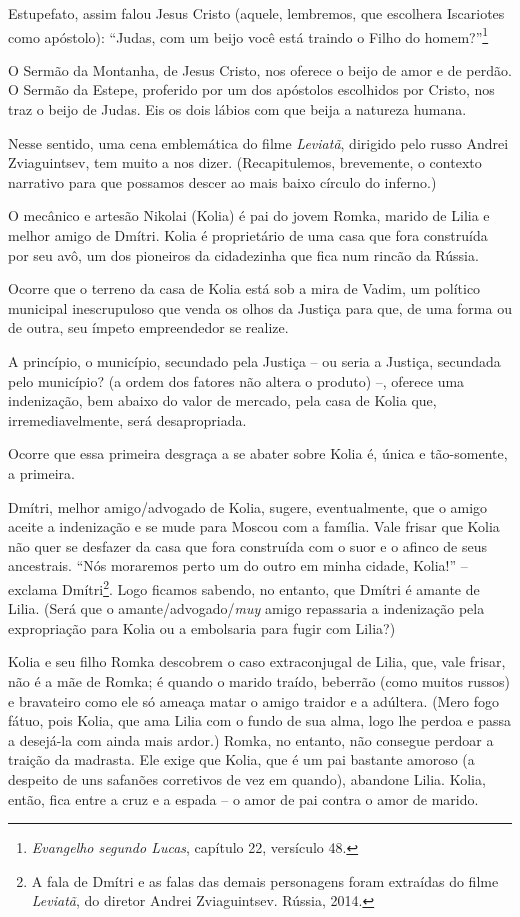 Estupefato, assim falou Jesus Cristo (aquele, lembremos, que escolhera
Iscariotes como apóstolo): ``Judas, com um beijo você está traindo o
Filho do homem?''\footnote{\emph{Evangelho segundo Lucas}, capítulo 22,
  versículo 48.}

O Sermão da Montanha, de Jesus Cristo, nos oferece o beijo de amor e de
perdão. O Sermão da Estepe, proferido por um dos apóstolos escolhidos
por Cristo, nos traz o beijo de Judas. Eis os dois lábios com que beija
a natureza humana.

Nesse sentido, uma cena emblemática do filme \emph{Leviatã}, dirigido
pelo russo Andrei Zviaguintsev, tem muito a nos dizer. (Recapitulemos,
brevemente, o contexto narrativo para que possamos descer ao mais baixo
círculo do inferno.)

O mecânico e artesão Nikolai (Kolia) é pai do jovem Romka, marido de
Lilia e melhor amigo de Dmítri. Kolia é proprietário de uma casa que
fora construída por seu avô, um dos pioneiros da cidadezinha que fica
num rincão da Rússia.

Ocorre que o terreno da casa de Kolia está sob a mira de Vadim, um
político municipal inescrupuloso que venda os olhos da Justiça para que,
de uma forma ou de outra, seu ímpeto empreendedor se realize.

A princípio, o município, secundado pela Justiça -- ou seria a Justiça,
secundada pelo município? (a ordem dos fatores não altera o produto) --,
oferece uma indenização, bem abaixo do valor de mercado, pela casa de
Kolia que, irremediavelmente, será desapropriada.

Ocorre que essa primeira desgraça a se abater sobre Kolia é, única e
tão-somente, a primeira.

Dmítri, melhor amigo/advogado de Kolia, sugere, eventualmente, que o
amigo aceite a indenização e se mude para Moscou com a família. Vale
frisar que Kolia não quer se desfazer da casa que fora construída com o
suor e o afinco de seus ancestrais. ``Nós moraremos perto um do outro em
minha cidade, Kolia!'' -- exclama Dmítri\footnote{A fala de Dmítri e as
  falas das demais personagens foram extraídas do filme \emph{Leviatã},
  do diretor Andrei Zviaguintsev. Rússia, 2014.}. Logo ficamos sabendo,
no entanto, que Dmítri é amante de Lilia. (Será que o
amante/advogado/\emph{muy} amigo repassaria a indenização pela
expropriação para Kolia ou a embolsaria para fugir com Lilia?)

Kolia e seu filho Romka descobrem o caso extraconjugal de Lilia, que,
vale frisar, não é a mãe de Romka; é quando o marido traído, beberrão
(como muitos russos) e bravateiro como ele só ameaça matar o amigo
traidor e a adúltera. (Mero fogo fátuo, pois Kolia, que ama Lilia com o
fundo de sua alma, logo lhe perdoa e passa a desejá-la com ainda mais
ardor.) Romka, no entanto, não consegue perdoar a traição da madrasta.
Ele exige que Kolia, que é um pai bastante amoroso (a despeito de uns
safanões corretivos de vez em quando), abandone Lilia. Kolia, então,
fica entre a cruz e a espada -- o amor de pai contra o amor de marido.

